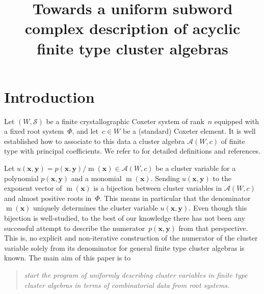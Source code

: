 \documentclass[ALCO,Unicode,ThmDefs]{cedram}
\title [Finite type cluster algebras from subword complexes]{Towards a uniform subword complex description of acyclic finite type cluster algebras}
\author[\initial{S.} \middlename{B.} Brodsky]{\firstname{Sarah} \middlename{B.} \lastname{Brodsky}}
\author[\initial{C.} Stump]{\firstname{Christian} \lastname{Stump}}
\DeclareMathOperator{\mon}{m}
\newcommand{\x}{\mathbf{x}}
\newcommand{\y}{\mathbf{y}}
\newcommand{\Alg}{\mathcal{A}}
\newcommand{\sref}{\mathcal{S}}
\begin{document}
\maketitle

\section{Introduction}

Let $(W,\sref)$ be a finite crystallographic Coxeter system of rank~$n$ equipped with a fixed root system~$\Phi$, and let~$c \in W$ be a (standard) Coxeter element. It is well established how to associate to this data a cluster algebra $\Alg(W,c)$ of finite type with principal coefficients. We refer to  for detailed definitions and references.

Let $u(\x,\y) = p(\x,\y)/\mon(\x) \in \Alg(W,c)$ be a cluster variable for a polynomial $p(\x,\y)$ and a monomial $\mon(\x)$. Sending $u(\x,\y)$ to the exponent vector of $\mon(\x)$ is a bijection between cluster variables in $\Alg(W,c)$ and almost positive roots in~$\Phi$. This means in particular that the denominator $\mon(\x)$ uniquely determines the cluster variable $u(\x,\y)$. Even though this bijection is well-studied, to the best of our knowledge there has not been any successful attempt to describe the numerator~$p(\x,\y)$ from that perspective. This is, no explicit and non-iterative construction of the numerator of the cluster variable solely from its denominator for general finite type cluster algebras is known. The main aim of this paper is to
\begin{quote}
\emph{start the program of uniformly describing cluster variables in finite type cluster algebras in terms of combinatorial data from root systems.}
\end{quote}
\end{document}
